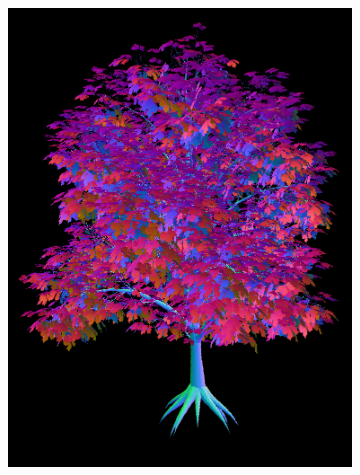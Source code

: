 \begin{figure}[t]
    \centering
    \begin{subfigure}[b]{0.3\linewidth}
        \centering
        \includegraphics[width=1\linewidth]{img/normal_map_mesh.png}
        \caption{}
    \end{subfigure}
    \begin{subfigure}[b]{0.3\linewidth}
        \centering

\end{subfigure}
\end{figure}

